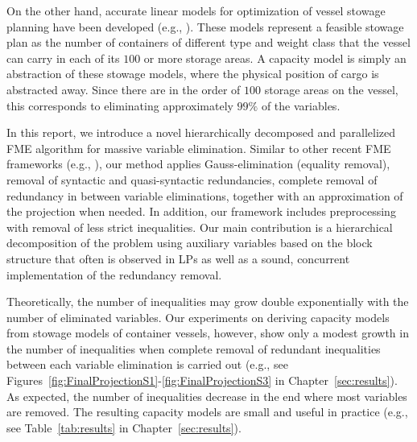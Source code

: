 On the other hand, accurate linear models for optimization of vessel stowage planning have been developed (e.g., {\cite{BB92,pacino11,pacino12,AlbertosThesis}}). These models represent a feasible stowage plan as the number of containers of different type and weight class that the vessel can carry in each of its $100$ or more storage areas. A capacity model is simply an abstraction of these stowage models, where the physical position of cargo is abstracted away. Since there are in the order of $100$ storage areas on the vessel, this corresponds to eliminating approximately $99\%$ of the variables. 

In this report, we introduce a novel hierarchically decomposed and parallelized FME algorithm for massive variable elimination. Similar to other recent FME frameworks (e.g., \cite{simon05,lukatskii08,shapot12}), our method applies Gauss\--eli\-mi\-na\-tion (equality removal), removal of syntactic and quasi-syntactic redundancies, complete removal of redundancy in between variable eliminations, together with an approximation of the projection when needed. In addition, our framework includes preprocessing with removal of less strict inequalities. 
Our main contribution is a hierarchical decomposition of the problem using auxiliary variables based on the block structure that often is observed in LPs \cite{williams} as well as a sound, concurrent implementation of the redundancy removal. 

Theoretically, the number of inequalities may grow double exponentially with the number of eliminated variables. Our experiments on deriving capacity models from stowage models of container vessels, however, show only a modest growth in the number of inequalities  when complete removal of redundant inequalities between each variable elimination is carried out (e.g., see Figures~\ref{fig:FinalProjectionS1}-\ref{fig:FinalProjectionS3} in Chapter~\ref{sec:results}). As expected, the number of inequalities decrease in the end where most variables are removed. The resulting capacity models are small and useful in practice (e.g., see Table~\ref{tab:results} in Chapter~\ref{sec:results}). 

